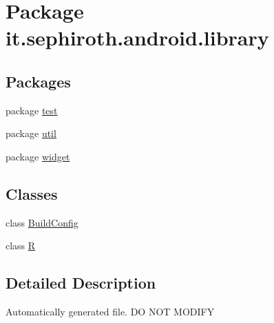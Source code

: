 \hypertarget{namespaceit_1_1sephiroth_1_1android_1_1library}{}\section{Package it.\+sephiroth.\+android.\+library}
\label{namespaceit_1_1sephiroth_1_1android_1_1library}
\subsection*{Packages}
\begin{DoxyCompactItemize}
\item 
package \hyperlink{namespaceit_1_1sephiroth_1_1android_1_1library_1_1test}{test}
\item 
package \hyperlink{namespaceit_1_1sephiroth_1_1android_1_1library_1_1util}{util}
\item 
package \hyperlink{namespaceit_1_1sephiroth_1_1android_1_1library_1_1widget}{widget}
\end{DoxyCompactItemize}
\subsection*{Classes}
\begin{DoxyCompactItemize}
\item 
class \hyperlink{classit_1_1sephiroth_1_1android_1_1library_1_1_build_config}{Build\+Config}
\item 
class \hyperlink{classit_1_1sephiroth_1_1android_1_1library_1_1_r}{R}
\end{DoxyCompactItemize}


\subsection{Detailed Description}
Automatically generated file. DO N\+OT M\+O\+D\+I\+FY 